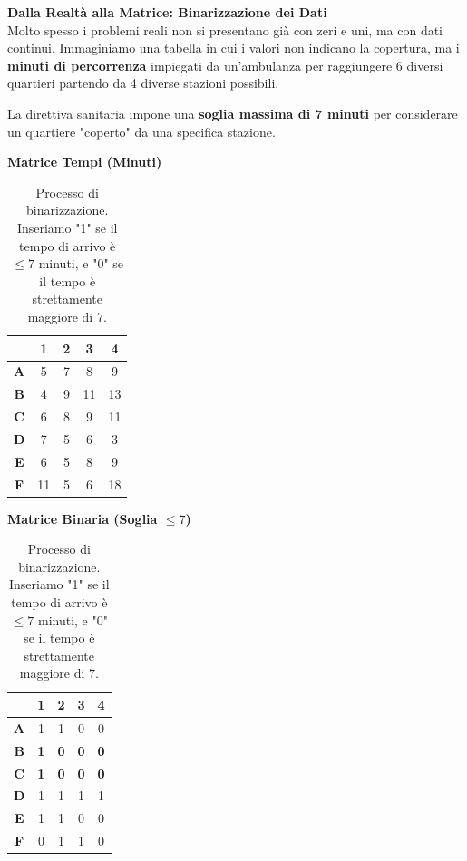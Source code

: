 \documentclass[12pt, a4paper]{article}
\renewcommand{\arraystretch}{1.25}
\newcommand{\separatore}{\noindent{\color{titlecolor!50}\rule{\textwidth}{0.6pt}}}
\begin{document}
	\vspace{0.6cm}
	\separatore
	\vspace{0.4cm}
	
	\textbf{Dalla Realtà alla Matrice: Binarizzazione dei Dati}\\
	Molto spesso i problemi reali non si presentano già con zeri e uni, ma con dati continui. Immaginiamo una tabella in cui i valori non indicano la copertura, ma i \textbf{minuti di percorrenza} impiegati da un'ambulanza per raggiungere 6 diversi quartieri partendo da 4 diverse stazioni possibili. 
	
	La direttiva sanitaria impone una \textbf{soglia massima di 7 minuti} per considerare un quartiere "coperto" da una specifica stazione.
	
	\begin{table}[H]
		\centering
		\begin{minipage}{0.45\textwidth}
			\centering
			\textbf{Matrice Tempi (Minuti)}
			\vspace{0.2cm}\\
			\renewcommand{\arraystretch}{1.2}
			\begin{tabular}{|c|c|c|c|c|}
				\hline
				& \textbf{1} & \textbf{2} & \textbf{3} & \textbf{4} \\ \hline
				\textbf{A} & 5 & 7 & 8 & 9 \\ \hline
				\textbf{B} & 4 & 9 & 11 & 13 \\ \hline
				\textbf{C} & 6 & 8 & 9 & 11 \\ \hline
				\textbf{D} & 7 & 5 & 6 & 3 \\ \hline
				\textbf{E} & 6 & 5 & 8 & 9 \\ \hline
				\textbf{F} & 11 & 5 & 6 & 18 \\ \hline
			\end{tabular}
		\end{minipage}
		\hfill
		\begin{minipage}{0.45\textwidth}
			\centering
			\textbf{Matrice Binaria (Soglia $\leq 7$)}
			\vspace{0.2cm}\\
			\renewcommand{\arraystretch}{1.2}
			\begin{tabular}{|c|c|c|c|c|}
				\hline
				& \textbf{1} & \textbf{2} & \textbf{3} & \textbf{4} \\ \hline
				\textbf{A} & 1 & 1 & 0 & 0 \\ \hline
				\textbf{B} & \textbf{1} & \textbf{0} & \textbf{0} & \textbf{0} \\ \hline
				\textbf{C} & \textbf{1} & \textbf{0} & \textbf{0} & \textbf{0} \\ \hline
				\textbf{D} & 1 & 1 & 1 & 1 \\ \hline
				\textbf{E} & 1 & 1 & 0 & 0 \\ \hline
				\textbf{F} & 0 & 1 & 1 & 0 \\ \hline
			\end{tabular}
		\end{minipage}
		\caption{Processo di binarizzazione. Inseriamo "1" se il tempo di arrivo è $\leq 7$ minuti, e "0" se il tempo è strettamente maggiore di $7$.}
	\end{table}
	
\end{document}
